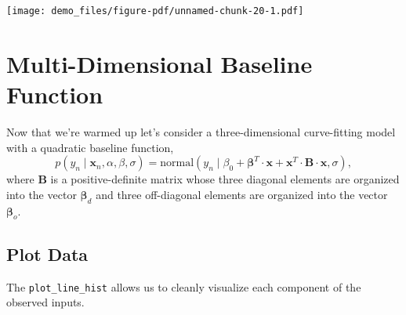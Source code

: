 \documentclass[
  letterpaper,
  DIV=11,
  numbers=noendperiod]{scrartcl}
\begin{document}
\texttt{[image: demo\_files/figure-pdf/unnamed-chunk-20-1.pdf]}

\section{Multi-Dimensional Baseline
Function}\label{multi-dimensional-baseline-function}

Now that we're warmed up let's consider a three-dimensional
curve-fitting model with a quadratic baseline function, \[
p(y_{n} \mid \mathbf{x}_{n}, \alpha, \beta, \sigma)
=
\text{normal}(y_{n}   \mid \beta_{0}
                    + \boldsymbol{\beta}^{T} \cdot \mathbf{x}
                    + \mathbf{x}^{T} \cdot \mathbf{B} \cdot \mathbf{x}, \sigma),
\] where \(\mathbf{B}\) is a positive-definite matrix whose three
diagonal elements are organized into the vector
\(\boldsymbol{\beta}_{d}\) and three off-diagonal elements are organized
into the vector \(\boldsymbol{\beta}_{o}\).

\subsection{Plot Data}\label{plot-data}

The \texttt{plot\_line\_hist} allows us to cleanly visualize each
component of the observed inputs.
\end{document}
